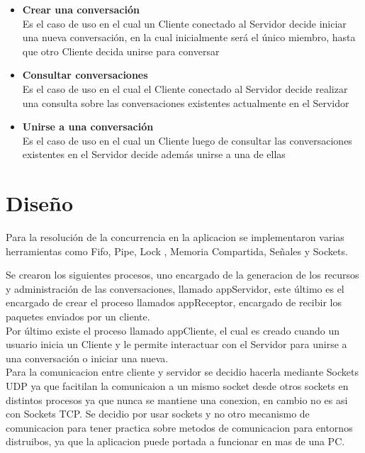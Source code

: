 \documentclass[a4paper,12pt,titlepage]{article}
\begin{document}
\begin{itemize}
\item \textbf{Crear una conversación}\\ 
  Es el caso de uso en el cual un Cliente conectado al Servidor decide iniciar una nueva conversación, en la cual inicialmente
  será el único miembro, hasta que otro Cliente decida unirse para conversar
\item \textbf{Consultar conversaciones}\\
  Es el caso de uso en el cual el Cliente conectado al Servidor decide realizar una consulta sobre las conversaciones
  existentes actualmente en el Servidor
\item \textbf{Unirse a una conversación}\\
  Es el caso de uso en el cual un Cliente luego de consultar las conversaciones existentes en el Servidor decide además
  unirse a una de ellas\\
\end{itemize} 


\newpage
\section{Diseño}

Para la resolución de la concurrencia en la aplicacion se implementaron varias herramientas como Fifo, Pipe, Lock , 
Memoria Compartida, Señales y Sockets.

Se crearon los siguientes procesos, uno encargado de la generacion de los recursos y administración de las conversaciones, llamado 
appServidor, este último es el encargado de crear el proceso llamados appReceptor, encargado de recibir los paquetes enviados por un cliente.\\

Por último existe el proceso llamado appCliente, el cual es creado cuando un usuario inicia un Cliente y le permite interactuar con
el Servidor para unirse a una conversación o iniciar una nueva.\\

Para la comunicacion entre cliente y servidor se decidio hacerla mediante Sockets UDP ya que facitilan la comunicaion a un mismo socket desde otros sockets en distintos procesos ya que nunca se mantiene una conexion, en cambio no es asi con Sockets TCP. Se decidio por usar sockets y no otro mecanismo de comunicacion para tener practica sobre metodos de comunicacion para entornos distruibos, ya que la aplicacion puede portada a funcionar en mas de una PC.
\end{document}
